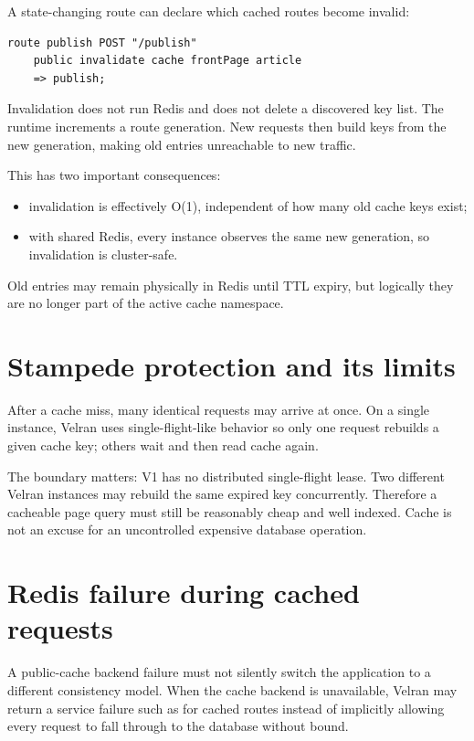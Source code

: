 A state-changing route can declare which cached routes become invalid:

\begin{lstlisting}[language=Velran]
route publish POST "/publish"
    public invalidate cache frontPage article
    => publish;
\end{lstlisting}

Invalidation does not run Redis  and does not delete a discovered key list. The runtime increments a route generation. New requests then build keys from the new generation, making old entries unreachable to new traffic.

This has two important consequences:

\begin{itemize}
  \item invalidation is effectively O(1), independent of how many old cache keys exist;
  \item with shared Redis, every instance observes the same new generation, so invalidation is cluster-safe.
\end{itemize}

Old entries may remain physically in Redis until TTL expiry, but logically they are no longer part of the active cache namespace.

\section{Stampede protection and its limits}

After a cache miss, many identical requests may arrive at once. On a single instance, Velran uses single-flight-like behavior so only one request rebuilds a given cache key; others wait and then read cache again.

The boundary matters: V1 has no distributed single-flight lease. Two different Velran instances may rebuild the same expired key concurrently. Therefore a cacheable page query must still be reasonably cheap and well indexed. Cache is not an excuse for an uncontrolled expensive database operation.

\section{Redis failure during cached requests}

A public-cache backend failure must not silently switch the application to a different consistency model. When the cache backend is unavailable, Velran may return a service failure such as  for cached routes instead of implicitly allowing every request to fall through to the database without bound.

